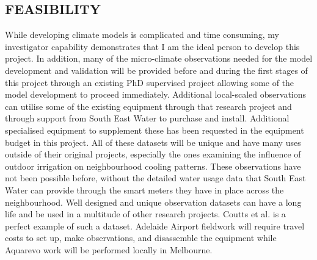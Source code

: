 \subsection*{\TitleFont FEASIBILITY}



While developing climate models is complicated and time consuming, my investigator capability demonstrates that I am the ideal person to develop this project. In addition, many of the micro-climate observations needed for the model development and validation will be provided before and during the first stages of this project through an existing PhD supervised project allowing some of the model development to proceed immediately. Additional local-scaled observations can utilise some of the existing equipment through that research project and through support from South East Water to purchase and install. Additional specialised equipment to supplement these has been requested in the equipment budget in this project. All of these datasets will be unique and have many uses outside of their original projects, especially the ones examining the influence of outdoor irrigation on neighbourhood cooling patterns. These observations have not been possible before, without the detailed water usage data that South East Water can provide through the smart meters they have in place across the neighbourhood. Well designed and unique observation datasets can have a long life and be used in a multitude of other research projects. Coutts et al.\cite{Coutts2007} is a perfect example of such a dataset. Adelaide Airport fieldwork will require travel costs to set up, make observations, and disassemble the equipment while Aquarevo work will be performed locally in Melbourne.

